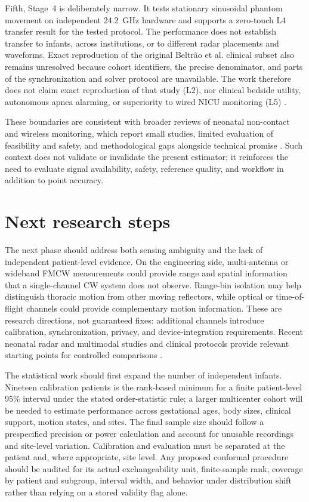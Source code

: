 Fifth, Stage~4 is deliberately narrow. It tests stationary sinusoidal phantom movement on
independent 24.2~GHz hardware and supports a zero-touch L4 transfer result for the tested
protocol. The performance does not establish transfer to infants, across institutions, or to
different radar placements and waveforms. Exact reproduction of the original Beltr\~ao et al.
clinical subset also remains unresolved because cohort identifiers, the precise denominator,
and parts of the synchronization and solver protocol are unavailable. The work therefore does
not claim exact reproduction of that study (L2), nor clinical bedside utility, autonomous apnea
alarming, or superiority to wired NICU monitoring (L5) \citep{beltrao2022contactless}.

These boundaries are consistent with broader reviews of neonatal non-contact and wireless
monitoring, which report small studies, limited evaluation of feasibility and safety, and
methodological gaps alongside technical promise \citep{senechal2026next}. Such context does not
validate or invalidate the present estimator; it reinforces the need to evaluate signal
availability, safety, reference quality, and workflow in addition to point accuracy.

\section{Next research steps}
\label{sec:ch7_future}

The next phase should address both sensing ambiguity and the lack of independent patient-level
evidence. On the engineering side, multi-antenna or wideband FMCW measurements could provide
range and spatial information that a single-channel CW system does not observe. Range-bin
isolation may help distinguish thoracic motion from other moving reflectors, while optical or
time-of-flight channels could provide complementary motion information. These are research
directions, not guaranteed fixes: additional channels introduce calibration, synchronization,
privacy, and device-integration requirements. Recent neonatal radar and multimodal studies and
clinical protocols provide relevant starting points for controlled comparisons \citep{liao2025noncontact,hari2025contactless,gleichauf2021automated}.

The statistical work should first expand the number of independent infants. Nineteen calibration
patients is the rank-based minimum for a finite patient-level 95\% interval under the stated
order-statistic rule; a larger multicenter cohort will be needed to estimate performance across
gestational ages, body sizes, clinical support, motion states, and sites. The final sample size
should follow a prespecified precision or power calculation and account for unusable recordings
and site-level variation. Calibration and evaluation must be separated at the patient and,
where appropriate, site level. Any proposed conformal procedure should be audited for its actual
exchangeability unit, finite-sample rank, coverage by patient and subgroup, interval width, and
behavior under distribution shift rather than relying on a stored validity flag alone.

